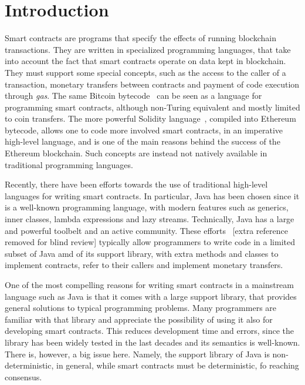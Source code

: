 \section{Introduction}\label{sec:introduction}

Smart contracts are programs that specify the effects of running blockchain transactions.
They are written in specialized programming languages, that take into account
the fact that smart contracts operate on data kept in blockchain. They must
support some special concepts, such as the access to the caller of a transaction,
monetary transfers between contracts
and payment of code execution through \emph{gas}.
The same Bitcoin bytecode~\cite{Antonopoulos17,Nakamoto08}
can be seen as a language for programming smart contracts,
although non-Turing equivalent and mostly limited to coin transfers. The more
powerful Solidity language~\cite{AntonopoulosW18},
compiled into Ethereum bytecode, allows one to code
more involved smart contracts, in an imperative high-level language, and is
one of the main reasons behind the success of the Ethereum blockchain.
Such concepts are instead not natively available
in traditional programming languages.

Recently, there have been efforts towards the use of traditional
high-level languages for writing smart contracts. In particular, Java has
been chosen since it is a well-known programming language,
with modern features such as generics, inner classes, lambda
expressions and lazy streams. Technically, Java has
a large and powerful toolbelt and an active community.
These efforts~\cite{aion,aion_example_contract,neo,neo_contract}
[extra reference removed for blind review]
typically allow programmers to write code in a limited subset of Java
amd of its support library,
with extra methods and classes to implement contracts, refer to their
callers and implement monetary transfers.

One of the most compelling reasons for writing smart contracts
in a mainstream language such as Java is that it comes with a large
support library, that provides general solutions to typical programming problems.
Many programmers are familiar with that library and appreciate the possibility
of using it also for developing smart contracts. This reduces
development time and errors, since the library has been widely tested
in the last decades and its semantics is well-known. There is, however, a big
issue here. Namely, the support library of Java is non-deterministic, in general,
while smart contracts must be deterministic, fo reaching consensus.

